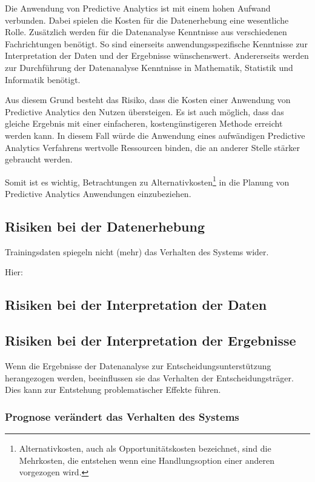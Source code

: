 Die Anwendung von Predictive Analytics ist mit einem hohen Aufwand verbunden.
Dabei spielen die Kosten für die Datenerhebung eine wesentliche Rolle.
Zusätzlich werden für die Datenanalyse Kenntnisse aus verschiedenen
Fachrichtungen benötigt. So sind einerseits anwendungsspezifische Kenntnisse
zur Interpretation der Daten und der Ergebnisse wünschenswert. Andererseits
werden zur Durchführung der Datenanalyse Kenntnisse in Mathematik, Statistik und
Informatik benötigt.

Aus diesem Grund besteht das Risiko, dass die Kosten einer Anwendung von
Predictive Analytics den Nutzen übersteigen. Es ist auch möglich, dass das
gleiche Ergebnis mit einer einfacheren, kostengünstigeren Methode erreicht
werden kann. In diesem Fall würde die Anwendung eines aufwändigen Predictive
Analytics Verfahrens wertvolle Ressourcen binden, die an anderer Stelle stärker
gebraucht werden. 

Somit ist es wichtig, Betrachtungen zu Alternativkosten\footnote{
Alternativkosten, auch als Opportunitätskosten bezeichnet, sind die Mehrkosten,
die entstehen wenn eine Handlungsoption einer anderen vorgezogen
wird. %
}
in die Planung von Predictive Analytics Anwendungen einzubeziehen. 

\subsection{Risiken bei der Datenerhebung}

Trainingsdaten spiegeln nicht (mehr) das Verhalten des Systems wider.

Hier: \cite{Springer}

\subsection{Risiken bei der Interpretation der Daten}

\subsection{Risiken bei der Interpretation der Ergebnisse}

Wenn die Ergebnisse der Datenanalyse zur Entscheidungsunterstützung herangezogen
werden, beeinflussen sie das Verhalten der Entscheidungsträger. Dies kann zur
Entstehung problematischer Effekte führen.

\subsubsection{Prognose verändert das Verhalten des Systems }

